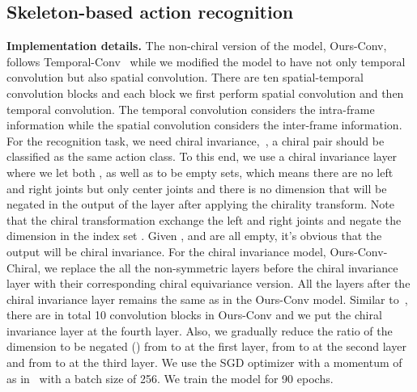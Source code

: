 \documentclass{article}
\begin{document}
\subsection{Skeleton-based action recognition}
\textbf{Implementation details.}
The non-chiral version of the model, Ours-Conv, follows Temporal-Conv~\cite{kim2017interpretable} while we modified the model to have not only temporal convolution but also spatial convolution. There are ten spatial-temporal convolution blocks and each block we first perform spatial convolution and then temporal convolution. The temporal convolution considers the intra-frame information while the spatial convolution considers the inter-frame information. For the recognition task, we need chiral invariance,~\ie, a chiral pair should be classified as the same action class. To this end, we use a chiral invariance layer where we let both ,  as well as  to be empty sets, which means there are no left and right joints but only center joints and there is no dimension that will be negated in the output of the layer after applying the chirality transform. Note that the chiral transformation exchange the left and right joints and negate the dimension in the index set . Given ,  and  are all empty, it's obvious that the output will be chiral invariance. For the chiral invariance model, Ours-Conv-Chiral, we replace the all the non-symmetric layers before the chiral invariance layer with their corresponding chiral equivariance version. All the layers after the chiral invariance layer remains the same as in the Ours-Conv model. Similar to~\cite{kim2017interpretable}, there are in total 10 convolution blocks in Ours-Conv and we put the chiral invariance layer at the fourth layer. Also, we gradually reduce the ratio of the dimension to be negated () from  to  at the first layer, from  to  at the second layer and from  to  at the third layer. We use the SGD optimizer with a momentum of  as in~\cite{yan2018stgcn} with a batch size of 256. We train the model for 90 epochs.

 
\end{document}
